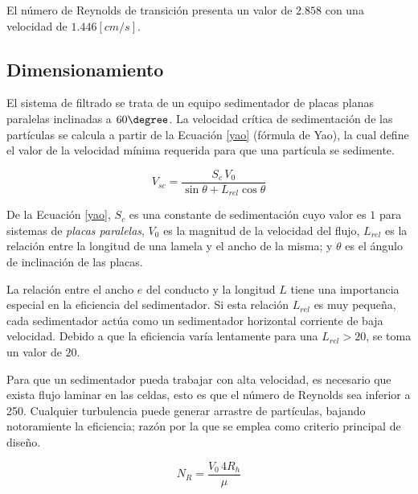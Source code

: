 \noindent
\justify

El n\'umero de Reynolds de transici\'on presenta un valor de $2.858$ con una velocidad de $1.446 [cm/s]$.

\subsection{Dimensionamiento}

\noindent
\justify

El sistema de filtrado se trata de un equipo sedimentador de placas planas paralelas inclinadas a $60 \degree$. La velocidad cr\'itica de sedimentaci\'on de las part\'iculas se calcula a partir de la Ecuaci\'on \ref{yao} (f\'ormula de Yao), la cual define el valor de la velocidad m\'inima requerida para que una part\'icula se sedimente. 

\begin{equation}
	V_{sc} = \frac{S_c \, V_0}{\sin \theta + L_{rel} \cos \theta}
	\label{yao}
\end{equation}

\noindent
\justify

De la Ecuaci\'on \ref{yao}, $S_c$ es una constante de sedimentaci\'on cuyo valor es $1$ para sistemas de \textit{placas paralelas}, $V_0$ es la magnitud de la velocidad del flujo, $L_{rel}$ es la relaci\'on entre la longitud de una lamela y el ancho de la misma; y $\theta$ es el \'angulo de inclinaci\'on de las placas.

\noindent
\justify

La relaci\'on entre el ancho $e$ del conducto y la longitud $L$ tiene una importancia especial en la eficiencia del sedimentador. Si esta relaci\'on $L_{rel}$ es muy peque\~na, cada sedimentador act\'ua como un sedimentador horizontal corriente de baja velocidad. Debido a que la eficiencia var\'ia lentamente para una $L_{rel} > 20$, se toma un valor de $20$.

\noindent
\justify

Para que un sedimentador pueda trabajar con alta velocidad, es necesario que exista flujo laminar en las celdas, esto es que el n\'umero de Reynolds sea inferior a 250. Cualquier turbulencia puede generar arrastre de part\'iculas, bajando notoramiente la eficiencia; raz\'on por la que se emplea como criterio principal de dise\~no. 

\begin{equation}
	N_R = \frac{V_0 \, 4 R_h}{\mu}
	\label{Reynolds}
\end{equation}


